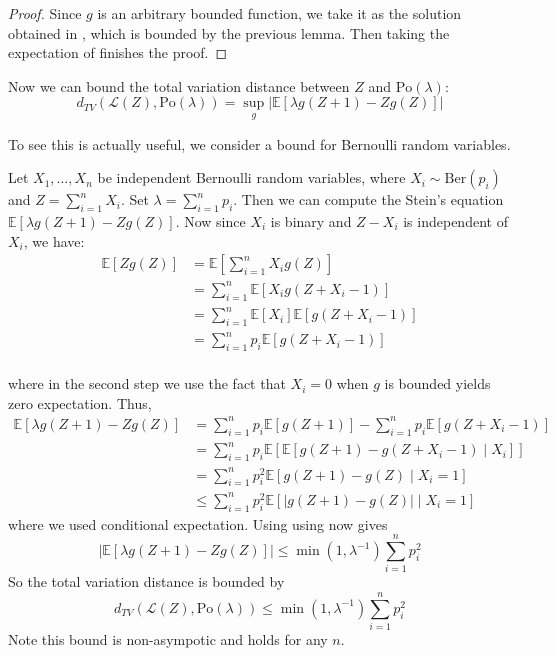 \documentclass{article}
\begin{document}
\begin{proof}
    Since $g$ is an arbitrary bounded function, we take it as the solution obtained in , which is bounded by the previous lemma. Then taking the expectation of  finishes the proof.
\end{proof}

Now we can bound the total variation distance between $Z$ and $\text{Po}(\lambda)$:
\begin{equation*}
    d_{TV}(\mathcal{L}(Z), \text{Po}(\lambda)) = \sup_{g} |\mathbb{E}[\lambda g(Z+1) - Zg(Z)]|
\end{equation*}

To see this is actually useful, we consider a bound for Bernoulli random variables. 

\begin{example}\label{ex:bernoulli_poisson}
    Let $X_1, \ldots, X_n$ be independent Bernoulli random variables, where $X_i \sim \text{Ber}(p_i)$ and $Z = \sum_{i=1}^n X_i$. Set $\lambda = \sum_{i=1}^n p_i$. Then we can compute the Stein's equation $\mathbb{E}[\lambda g(Z+1) - Zg(Z)]$.  Now since $X_i$ is binary and $Z-X_i$ is independent of $X_i$, we have:  
    \begin{align*}
        \mathbb{E}[Zg(Z)] &= \mathbb{E}[\sum_{i=1}^n X_i g(Z)]\\
        &= \sum_{i=1}^n \mathbb{E}[X_i g(Z + X_i - 1)]\\
        &= \sum_{i=1}^n \mathbb{E}[X_i] \mathbb{E}[g(Z + X_i - 1)]\\
        &= \sum_{i=1}^n p_i \mathbb{E}[g(Z + X_i - 1)]\\
    \end{align*}

    where in the second step we use the fact that $X_i=0$ when $g$ is bounded yields zero expectation. Thus, 
    \begin{align*}
        \mathbb{E}[\lambda g(Z+1) - Zg(Z)] &= \sum_{i=1}^n p_i \mathbb{E}[g(Z + 1)] - \sum_{i=1}^n p_i \mathbb{E}[g(Z + X_i - 1)]\\
        &= \sum_{i=1}^n p_i \mathbb{E}[\mathbb{E}[g(Z+1) - g(Z + X_i - 1) \mid X_i]]\\
        &= \sum_{i=1}^n p_i^2 \mathbb{E}[g(Z+1) - g(Z) \mid X_i=1]\\
        & \leq \sum_{i=1}^n p_i^2 \mathbb{E}[|g(Z+1) - g(Z)| \mid X_i=1]
    \end{align*}
    where we used conditional expectation.   
    Using using  now gives 
    \[|\mathbb{E}[\lambda g(Z+1) - Zg(Z)]| \leq \min (1, \lambda^{-1}) \sum_{i=1}^n p_i^2\]
    So the total variation distance is bounded by
    \begin{equation*}
        d_{TV}(\mathcal{L}(Z), \text{Po}(\lambda)) \leq \min (1, \lambda^{-1}) \sum_{i=1}^n p_i^2
    \end{equation*}
    Note this bound is non-asympotic and holds for any $n$.
\end{example}
\end{document}
